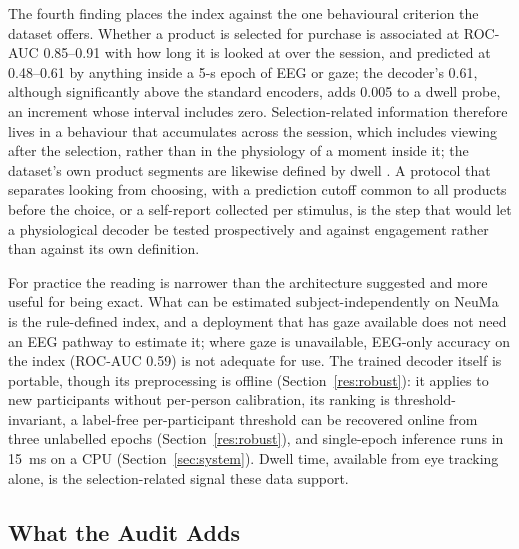 The fourth finding places the index against the one behavioural criterion the dataset offers. Whether a product is selected for purchase is associated at ROC-AUC 0.85--0.91 with how long it is looked at over the session, and predicted at 0.48--0.61 by anything inside a 5-s epoch of EEG or gaze; the decoder's 0.61, although significantly above the standard encoders, adds 0.005 to a dwell probe, an increment whose interval includes zero. Selection-related information therefore lives in a behaviour that accumulates across the session, which includes viewing after the selection, rather than in the physiology of a moment inside it; the dataset's own product segments are likewise defined by dwell \cite{ref35}. A protocol that separates looking from choosing, with a prediction cutoff common to all products before the choice, or a self-report collected per stimulus, is the step that would let a physiological decoder be tested prospectively and against engagement rather than against its own definition.

For practice the reading is narrower than the architecture suggested and more useful for being exact. What can be estimated subject-independently on NeuMa is the rule-defined index, and a deployment that has gaze available does not need an EEG pathway to estimate it; where gaze is unavailable, EEG-only accuracy on the index (ROC-AUC 0.59) is not adequate for use. The trained decoder itself is portable, though its preprocessing is offline (Section~\ref{res:robust}): it applies to new participants without per-person calibration, its ranking is threshold-invariant, a label-free per-participant threshold can be recovered online from three unlabelled epochs (Section~\ref{res:robust}), and single-epoch inference runs in 15~ms on a CPU (Section~\ref{sec:system}). Dwell time, available from eye tracking alone, is the selection-related signal these data support.

\subsection{What the Audit Adds}\label{disc:protocol}

